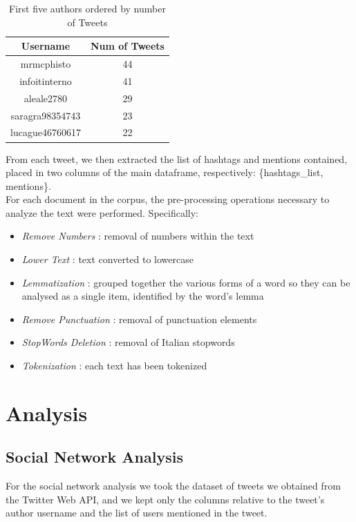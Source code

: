 \documentclass[12pt,journal,compsoc]{IEEEtran}
\begin{document}
\begin{table}[ht]
\centering
\begin{tabular}{c c }
	Username & Num of Tweets  \\
	\hline
	mrmcphisto & 44  \\
	infoitinterno & 41  \\
	aleale2780 & 29  \\
	saragra98354743 & 23  \\
	lucague46760617 & 22  \\
\end{tabular}
\caption{First five authors ordered by number of Tweets}
\end{table}

From each tweet, we then extracted the list of hashtags and mentions contained, placed in two columns of the main dataframe, respectively: \{hashtags\_list, mentions\}.\\
For each document in the corpus, the pre-processing operations necessary to analyze the text were performed. Specifically:

\begin{itemize}
	\item \textit{Remove Numbers} : removal of numbers within the text
	\item \textit{Lower Text} : text converted to lowercase
	\item \textit{Lemmatization} : grouped together the various forms of a word so they can be analysed as a single item, identified by the word's lemma
	\item \textit{Remove Punctuation} : removal of punctuation elements
	\item \textit{StopWords Deletion} : removal of Italian stopwords
	\item \textit{Tokenization} : each text has been tokenized
\end{itemize}

\section{Analysis}

\subsection{Social Network Analysis}
For the social network analysis we took the dataset of tweets we obtained from the Twitter Web API, and we kept only the columns relative to the tweet's author username and the list of users mentioned in the tweet.
 
\end{document}

